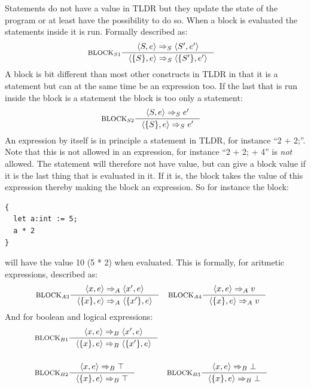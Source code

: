 Statements do not have a value in TLDR but they update the state of the program or at least have the possibility to do so. When a block is evaluated the statements inside it is run. Formally described as:
\begin{align*}
&\inference[$\text{BLOCK}_{S1}$]{\Braket{S,e} \Rightarrow_S \Braket{S',e'}}
                                {\Braket{\{S\},e} \Rightarrow_S \Braket{\{S'\},e'}}
\end{align*}
A block is bit different than most other constructs in TLDR in that it is a statement but can at the same time be an expression too. If the last that is run inside the block is a statement the block is too only a statement:
\begin{align*}
&\inference[$\text{BLOCK}_{S2}$]{\Braket{S,e} \Rightarrow_S e'}
                                {\Braket{\{S\},e} \Rightarrow_S e'}
\end{align*}
An expression by itself is in principle a statement in TLDR, for instance \enquote{2 + 2;}. Note that this is not allowed in an expression, for instance \enquote{2 + 2; + 4} is \emph{not} allowed. The statement will therefore not have value, but can give a block value if it is the last thing that is evaluated in it. If it is, the block takes the value of this expression thereby making the block an expression. So for instance the block:
\begin{lstlisting}
{
  let a:int := 5;
  a * 2
}
\end{lstlisting}
will have the value 10 (5 * 2) when evaluated. This is formally, for aritmetic expressions, described as:
\begin{align*}
&\inference[$\text{BLOCK}_{A3}$]{\Braket{x,e} \Rightarrow_A \Braket{x',e}}
                         {\Braket{\{x\},e} \Rightarrow_A \Braket{\{x'\},e}}
&
&\inference[$\text{BLOCK}_{A4}$]{\Braket{x,e} \Rightarrow_A v}
                         {\Braket{\{x\},e} \Rightarrow_A v}
\end{align*}
And for boolean and logical expressions:
\begin{align*}
&\inference[$\text{BLOCK}_{B1}$]{\Braket{x,e} \Rightarrow_B \Braket{x',e}}
                         {\Braket{\{x\},e} \Rightarrow_B \Braket{\{x'\},e}}
\\\\
&\inference[$\text{BLOCK}_{B2}$]{\Braket{x,e} \Rightarrow_B \top}
                         {\Braket{\{x\},e} \Rightarrow_B \top}
&
&\inference[$\text{BLOCK}_{B3}$]{\Braket{x,e} \Rightarrow_B \bot}
                         {\Braket{\{x\},e} \Rightarrow_B \bot}
\end{align*}
